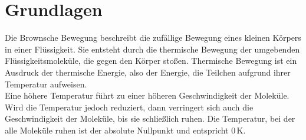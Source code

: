 \section*{Grundlagen}

Die Brownsche Bewegung beschreibt die zufällige Bewegung eines kleinen Körpers in einer Flüssigkeit. Sie entsteht durch die thermische Bewegung der umgebenden Flüssigkeitsmoleküle, die gegen den Körper stoßen.
Thermische Bewegung ist ein Ausdruck der thermische Energie, also der Energie, die Teilchen aufgrund ihrer Temperatur aufweisen.\\
Eine höhere Temperatur führt zu einer höheren Geschwindigkeit der Moleküle. Wird die Temperatur jedoch reduziert, dann verringert sich auch die Geschwindigkeit der Moleküle, bis sie schließlich ruhen. Die Temperatur, bei der alle Moleküle ruhen ist der absolute Nullpunkt und entspricht $0 \,$K.\\

